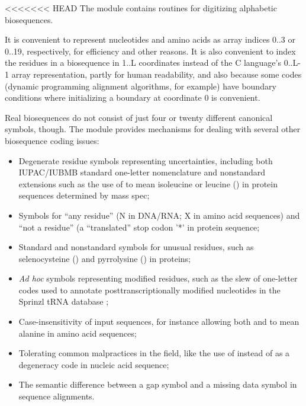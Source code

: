 <<<<<<< HEAD
The  module contains routines for digitizing
alphabetic biosequences.

It is convenient to represent nucleotides and amino acids as array
indices 0..3 or 0..19, respectively, for efficiency and other
reasons. It is also convenient to index the residues in a biosequence
in 1..L coordinates instead of the C language's 0..L-1 array
representation, partly for human readability, and also because some
codes (dynamic programming alignment algorithms, for example) have
boundary conditions where initializing a boundary at coordinate 0 is
convenient.

Real biosequences do not consist of just four or twenty different
canonical symbols, though. The  module provides
mechanisms for dealing with several other biosequence coding issues:

\begin{itemize}
  \item Degenerate residue symbols representing uncertainties,
        including both IUPAC/IUBMB standard one-letter nomenclature
        and nonstandard extensions such as the use of  to
        mean isoleucine or leucine () in protein sequences
        determined by mass spec;

  \item Symbols for ``any residue'' (N in DNA/RNA; X in amino acid
    sequences) and ``not a residue'' (a ``translated'' stop codon '*'
    in protein sequence;

  \item Standard and nonstandard symbols for unusual residues, such as
        selenocysteine () and pyrrolysine () in
        proteins;

  \item \emph{Ad hoc} symbols representing modified residues, such as
        the slew of one-letter codes used to annotate
        posttranscriptionally modified nucleotides in the Sprinzl tRNA
        database \citep{Sprinzl98};

  \item Case-insensitivity of input sequences, for instance allowing
        both  and  to mean alanine in amino acid
        sequences;

  \item Tolerating common malpractices in the field, like the use of
        instead of  as a degeneracy code in nucleic
       acid sequence;

  \item The semantic difference between a gap symbol and a missing
        data symbol in sequence alignments.
\end{itemize}        

